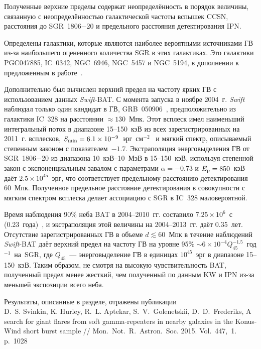 Полученные верхние пределы содержат неопределённость в порядок величины, связанную с
неопределённостью галактической частоты вспышек CCSN, расстояния до SGR~1806$-$20 и
предельного расстояния детектирования IPN.

Определены галактики, которые являются наиболее вероятными источниками ГВ 
из-за наибольшего оцененного количества SGR в этих галактиках. Это галактики
PGC047885, IC~0342, NGC~6946, NGC~5457 и NGC~5194, в дополнении к предложенным 
в работе~\citep{Popov2006}.

Дополнительно был вычислен верхний предел на частоту ярких ГВ с использованием 
данных \textit{Swift}-BAT. С момента запуска в ноябре 2004~г. \textit{Swift} наблюдал 
только один кандидат в ГВ, GRB~050906~\citep{Levan2008}, предположительно из 
галактики IC~328 на расстоянии $\approx 130$~Мпк. Этот всплеск имел наименьший 
интегральный поток в диапазоне 15--150~кэВ из всех зарегистрированных на 2011~г. всплесков, 
$S_{{\mathrm{min}}} = 6.1\times10^{-9}$~эрг~см$^{-2}$~\citep{Sakamoto2011ApJS} и 
мягкий спектр, описываемый степенным законом с показателем~$-1.7$. Экстраполяция 
энерговыделения ГВ от SGR~1806$-$20 из диапазона 10~кэВ--10~МэВ в 15--150~кэВ, 
используя степенной закон с экспоненциальным завалом с параметрами $\alpha=-0.73$ 
и $E_{{\mathrm{p}}}=850$~кэВ даёт $2.5\times10^{45}$~эрг, что соответствует предельному 
расстоянию детектирования 60~Мпк. Полученное предельное расстояние детектирования 
в совокупности с мягким спектром всплеска делает ассоциацию с SGR в IC~328 маловероятной.

Время наблюдения 90\% неба BAT в 2004--2010~гг. 
составило $7.25\times10^{6}$~с (0.23~года)~\citep{Baumgartner2013ApJS}, и экстраполяция 
этой величины на 2004--2013~гг. даёт 0.35~лет. Отсутствие зарегистрированных ГВ в 
объеме $d \lesssim 60$~Мпк в течение наблюдений \textit{Swift}-BAT даёт верхний предел 
на частоту ГВ на уровне 95\% $\sim 6 \times 10^{-4} Q_{45}^{-1.5} $~год$^{-1}$~на~SGR, 
где $Q_{45}$~--- энерговыделение ГВ в единицах $10^{45}$~эрг в диапазоне 15--150~кэВ. 
Таким образом, не смотря на высокую чувствительность BAT, полученный предел 
менее жесткий, чем полученный по данным KW и IPN из-за меньшей экспозиции всего неба.

Результаты, описанные в разделе, отражены публикации\\
D.~S. Svinkin, K. Hurley, R.~L. Aptekar, S.~V.~Golenetskii, D.~D.~Frederiks, 
A search for giant flares from soft gamma-repeaters in nearby galaxies in the 
Konus-Wind short burst sample // Mon.~Not.~R.~Astron.~Soc. 2015. Vol.~447,~1. p.~1028

\clearpage